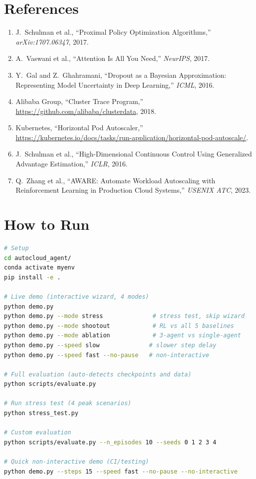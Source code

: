 \documentclass[11pt,a4paper]{article}
\begin{document}
\section{References}\label{sec:references}


\begin{enumerate}[leftmargin=2em]
  \item J.~Schulman et al., ``Proximal Policy Optimization Algorithms,''
        \textit{arXiv:1707.06347}, 2017.
  \item A.~Vaswani et al., ``Attention Is All You Need,''
        \textit{NeurIPS}, 2017.
  \item Y.~Gal and Z.~Ghahramani, ``Dropout as a Bayesian Approximation:
        Representing Model Uncertainty in Deep Learning,''
        \textit{ICML}, 2016.
  \item Alibaba Group, ``Cluster Trace Program,''
        \url{https://github.com/alibaba/clusterdata}, 2018.
  \item Kubernetes, ``Horizontal Pod Autoscaler,''
        \url{https://kubernetes.io/docs/tasks/run-application/horizontal-pod-autoscale/}.
  \item J.~Schulman et al., ``High-Dimensional Continuous Control Using
        Generalized Advantage Estimation,'' \textit{ICLR}, 2016.
  \item Q.~Zhang et al., ``AWARE: Automate Workload Autoscaling with
        Reinforcement Learning in Production Cloud Systems,''
        \textit{USENIX ATC}, 2023.
\end{enumerate}


\section{How to Run}


\begin{lstlisting}[language=bash]
# Setup
cd autocloud_agent/
conda activate myenv
pip install -e .

# Live demo (interactive wizard, 4 modes)
python demo.py
python demo.py --mode stress              # stress test, skip wizard
python demo.py --mode shootout            # RL vs all 5 baselines
python demo.py --mode ablation            # 3-agent vs single-agent
python demo.py --speed slow              # slower step delay
python demo.py --speed fast --no-pause   # non-interactive

# Full evaluation (auto-detects checkpoints and data)
python scripts/evaluate.py

# Run stress test (4 peak scenarios)
python stress_test.py

# Custom evaluation
python scripts/evaluate.py --n_episodes 10 --seeds 0 1 2 3 4

# Quick non-interactive demo (CI/testing)
python demo.py --steps 15 --speed fast --no-pause --no-interactive
\end{lstlisting}
\end{document}
